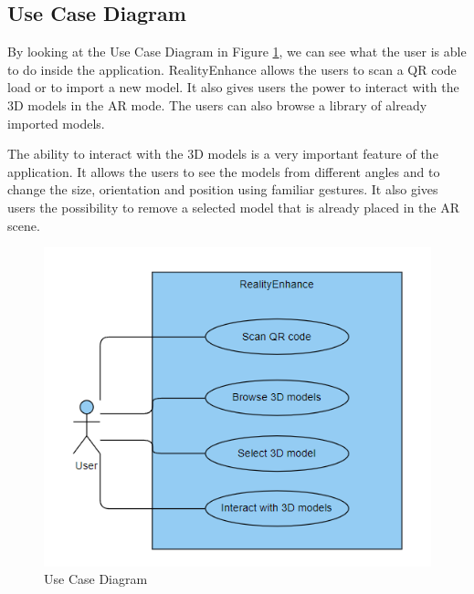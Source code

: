 \subsection*{Use Case Diagram}
By looking at the Use Case Diagram in Figure \ref{fig:UseCaseDiagram}, we can see what the user is able to do inside the application. RealityEnhance allows the users to scan a \ac{QR} code load or to import a new model. It also gives users the power to interact with the \ac{3D} models in the \ac{AR} mode. The users can also browse a library of already imported models.

The ability to interact with the \ac{3D} models is a very important feature of the application. It allows the users to see the models from different angles and to change the size, orientation and position using familiar gestures. It also gives users the possibility to remove a selected model that is already placed in the \ac{AR} scene.
\begin{figure}[ht]
    \centering
    \includegraphics{img/UseCaseDiagram.png}
    \caption{Use Case Diagram}
    \label{fig:UseCaseDiagram}
\end{figure}

\clearpage

